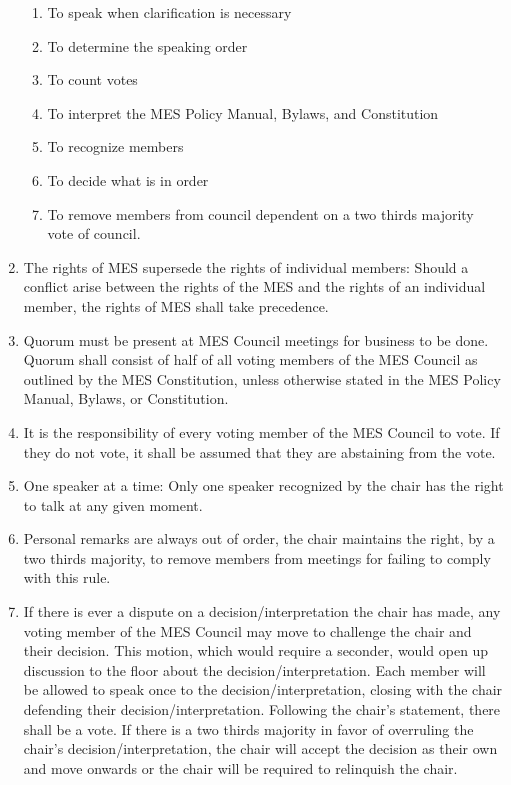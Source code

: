 \begin{enumerate}
  \begin{enumerate}
   \item
    To speak when clarification is necessary
   \item
    To determine the speaking order
   \item
    To count votes
   \item
    To interpret the MES Policy Manual, Bylaws, and Constitution
   \item
    To recognize members
   \item
    To decide what is in order
   \item
    To remove members from council dependent on a two thirds majority
    vote of council. %
  \end{enumerate}
 \item
  The rights of MES supersede the rights of individual members: Should a
  conflict arise between the rights of the MES and the rights of an
  individual member, the rights of MES shall take precedence.
 \item
  Quorum must be present at MES Council meetings for business to be
  done. Quorum shall consist of half of all voting members of the MES
  Council as outlined by the MES Constitution, unless otherwise stated
  in the MES Policy Manual, Bylaws, or Constitution.
 \item
  It is the responsibility of every voting member of the MES Council to
  vote. If they do not vote, it shall be assumed that they are
  abstaining from the vote.
 \item
  One speaker at a time: Only one speaker recognized by the chair has
  the right to talk at any given moment.
 \item
  Personal remarks are always out of order, the chair maintains the
  right, by a two thirds majority, to remove members from meetings for
  failing to comply with this rule.
 \item
  If there is ever a dispute on a decision/interpretation the chair has
  made, any voting member of the MES Council may move to challenge the
  chair and their decision. This motion, which would require a seconder,
  would open up discussion to the floor about the
  decision/interpretation. Each member will be allowed to speak once to
  the decision/interpretation, closing with the chair defending their
  decision/interpretation. Following the chair's statement, there shall
  be a vote. If there is a two thirds majority in favor of overruling
  the chair's decision/interpretation, the chair will accept the
  decision as their own and move onwards or the chair will be required
  to relinquish the chair.

\end{enumerate}

